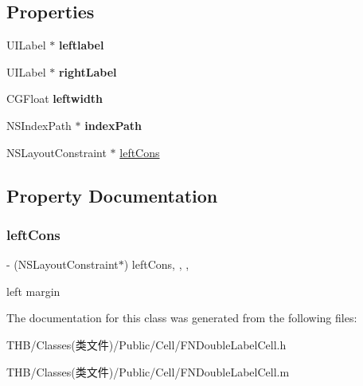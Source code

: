 \subsection*{Properties}
\begin{DoxyCompactItemize}
\item 
\mbox{\label{interface_f_n_double_label_cell_a10938832229241ae519df59cb456908e}} 
U\+I\+Label $\ast$ {\bfseries leftlabel}
\item 
\mbox{\label{interface_f_n_double_label_cell_a68ede7a49a3c2ac7886842fea6f8cb7d}} 
U\+I\+Label $\ast$ {\bfseries right\+Label}
\item 
\mbox{\label{interface_f_n_double_label_cell_ad413e49765e2fe1f9110d33d39af8fd9}} 
C\+G\+Float {\bfseries leftwidth}
\item 
\mbox{\label{interface_f_n_double_label_cell_aeba34b6da958820d6a3781754c8acf70}} 
N\+S\+Index\+Path $\ast$ {\bfseries index\+Path}
\item 
N\+S\+Layout\+Constraint $\ast$ \mbox{\hyperlink{interface_f_n_double_label_cell_a48531a48aecde543f1d0b5f7f79cb0a2}{left\+Cons}}
\end{DoxyCompactItemize}


\subsection{Property Documentation}
\mbox{\label{interface_f_n_double_label_cell_a48531a48aecde543f1d0b5f7f79cb0a2}} 
\subsubsection{\texorpdfstring{left\+Cons}{leftCons}}
{\footnotesize\ttfamily -\/ (N\+S\+Layout\+Constraint$\ast$) left\+Cons\hspace{0.3cm}{\ttfamily [read]}, {\ttfamily [write]}, {\ttfamily [nonatomic]}, {\ttfamily [strong]}}

left margin 

The documentation for this class was generated from the following files\+:\begin{DoxyCompactItemize}
\item 
T\+H\+B/\+Classes(类文件)/\+Public/\+Cell/F\+N\+Double\+Label\+Cell.\+h\item 
T\+H\+B/\+Classes(类文件)/\+Public/\+Cell/F\+N\+Double\+Label\+Cell.\+m\end{DoxyCompactItemize}
